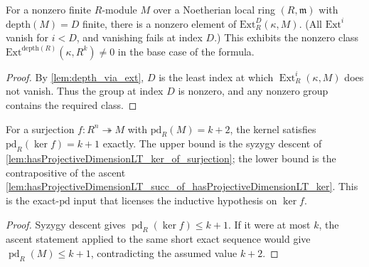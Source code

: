 \begin{lemma}\leanok
  \label{lem:exists_ne_zero_ext_of_depth_eq}
  For a nonzero finite \(R\)-module \(M\) over a Noetherian local ring \((R, \mathfrak m)\)
  with \(\text{depth}(M) = D\) finite, there is a nonzero element of
  \(\text{Ext}^D_R(\kappa, M)\). (All \(\text{Ext}^i\) vanish for \(i < D\), and
  vanishing fails at index \(D\).) This exhibits the nonzero class
  \(\text{Ext}^{\text{depth}(R)}(\kappa, R^k) \neq 0\) in the base case of the formula.
\end{lemma}
\begin{proof}

\leanok
  By \cref{lem:depth_via_ext}, \(D\) is the least index at which
  \(\operatorname{Ext}^i_R(\kappa,M)\) does not vanish. Thus the group at
  index \(D\) is nonzero, and any nonzero group contains the required class.
\end{proof}

\begin{lemma}\leanok
  \label{lem:projectiveDimension_ker_eq_of_surjection}
  For a surjection \(f : R^n \twoheadrightarrow M\) with \(\text{pd}_R(M) = k + 2\), the
  kernel satisfies \(\text{pd}_R(\ker f) = k + 1\) exactly. The upper bound is the
  syzygy descent of \cref{lem:hasProjectiveDimensionLT_ker_of_surjection}; the lower
  bound is the contrapositive of the ascent
  \cref{lem:hasProjectiveDimensionLT_succ_of_hasProjectiveDimensionLT_ker}. This is
  the exact-\(\text{pd}\) input that licenses the inductive hypothesis on \(\ker f\).
\end{lemma}
\begin{proof}

\leanok
  Syzygy descent gives \(\operatorname{pd}_R(\ker f)\leq k+1\).
  If it were at most \(k\), the ascent statement applied to the same short
  exact sequence would give \(\operatorname{pd}_R(M)\leq k+1\), contradicting
  the assumed value \(k+2\).
\end{proof}


